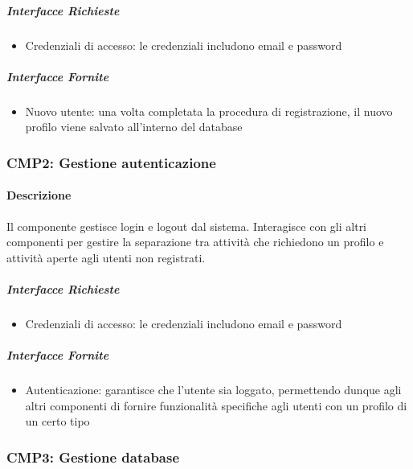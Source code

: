 \documentclass[9pt]{extarticle}
\begin{document}
\subparagraph{Interfacce Richieste}
\begin{itemize}
	\item Credenziali di accesso: le credenziali includono email e password
\end{itemize}

\subparagraph{Interfacce Fornite}
\begin{itemize}
	\item Nuovo utente: una volta completata la procedura di registrazione, il nuovo profilo viene salvato all'interno del database
\end{itemize}


\subsubsection*{CMP2: Gestione autenticazione}
\paragraph{Descrizione}
Il componente gestisce login e logout dal sistema. Interagisce con gli altri componenti per gestire la separazione tra attività che richiedono un profilo e attività aperte agli utenti non registrati.
\subparagraph{Interfacce Richieste}
\begin{itemize}
	\item Credenziali di accesso: le credenziali includono email e password
\end{itemize}

\subparagraph{Interfacce Fornite}
\begin{itemize}
	\item Autenticazione: garantisce che l'utente sia loggato, permettendo dunque agli altri componenti di fornire funzionalità specifiche agli utenti con un profilo di un certo tipo
\end{itemize}

\subsubsection*{CMP3: Gestione database}
\end{document}
